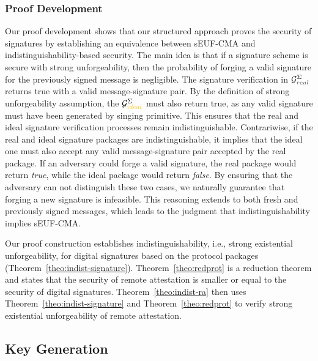\subsubsection{Proof Development}
%
Our proof development shows that our structured approach proves 
the security of signatures by establishing an equivalence between 
sEUF-CMA and indistinguishability-based security. 
%
The main idea is that if a signature scheme is secure with strong unforgeability, 
then the probability of forging a valid signature for the previously signed message is negligible. 
%
The signature verification in $\mathcal{G}_{\real}^{\Sigma}$ returns true with a valid message-signature pair. 
%
By the definition of strong unforgeability assumption, the $\mathcal{G}_{\ideal}^{\Sigma}$ must also return true, 
as any valid signature must have been generated by singing primitive. 
%
This ensures that the real and ideal signature verification processes remain indistinguishable. 
%
Contrariwise, if the real and ideal signature packages are 
indistinguishable, it implies that the ideal one must also 
accept any valid message-signature pair accepted by the real package. 
%
If an adversary could forge a valid signature, the real package would return \emph{true}, 
while the ideal package would return \emph{false}. 
%
By ensuring that the adversary can not distinguish these two cases, 
we naturally guarantee that forging a new signature is infeasible. 
%
This reasoning extends to both fresh and previously signed messages, which leads 
to the judgment that indistinguishability implies sEUF-CMA. 
%

Our proof construction establishes indistinguishability, i.e.,
strong existential unforgeability, for digital signatures based on
the protocol packages (Theorem~\ref{theo:indist-signature}). 
%
Theorem~\ref{theo:redprot} is a reduction theorem and states that
the security of remote attestation is smaller or equal to the
security of digital signatures.
%
Theorem~\ref{theo:indist-ra} then uses Theorem~\ref{theo:indist-signature}
and Theorem~\ref{theo:redprot} to verify strong existential
unforgeability of remote attestation.
%


\subsection{Key Generation}

